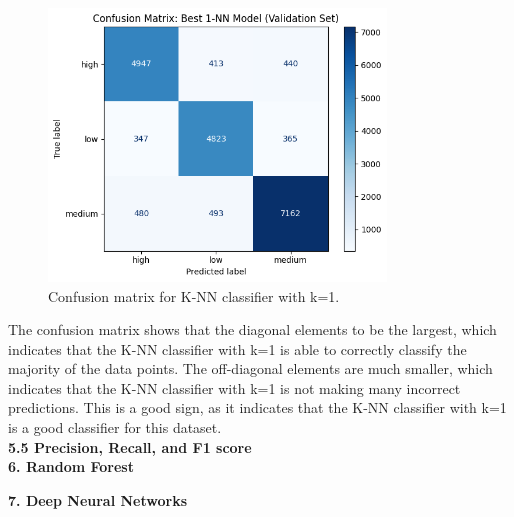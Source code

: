 \documentclass[12pt]{article}
\begin{document}
\begin{figure}[h!]
\centering
\includegraphics[width=0.8\textwidth]{figures/knn_confusion_matrix.png}
\caption{Confusion matrix for K-NN classifier with k=1.}
\label{fig:knn_confusion_matrix}
\end{figure}

The confusion matrix shows that the diagonal elements to be the largest, which indicates that the K-NN classifier with k=1 is able to correctly classify the majority of the data points. The off-diagonal elements are much smaller, which indicates that the K-NN classifier with k=1 is not making many incorrect predictions. This is a good sign, as it indicates that the K-NN classifier with k=1 is a good classifier for this dataset.
\\

\textbf{5.5 Precision, Recall, and F1 score}
\\


\textbf{6. Random Forest}

\textbf{7. Deep Neural Networks}
\end{document}
